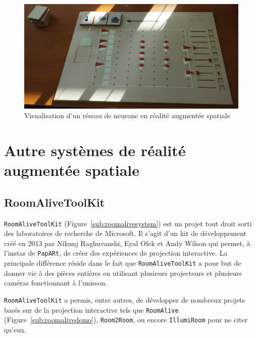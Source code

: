 \begin{figure}[H]
\centering
\includegraphics[width=0.65\linewidth]{images/neural-network}
\caption{Visualisation d'un réseau de neurone en réalité augmentée spatiale\protect\footnotemark}
\label{fig:neuralnetwork}
\end{figure}


\section{Autre systèmes de réalité augmentée spatiale}
\label{sec:SARother}

\subsection{RoomAliveToolKit} 
\texttt{RoomAliveToolKit}\cite{Jones:2014:RME:2642918.2647383} (Figure~\ref{sub:roomalivesystem}) est un projet tout droit sorti des laboratoires de recherche de Microsoft. Il s'agit d'un kit de développement créé en 2013 par Nikunj Raghuvanshi, Eyal Ofek et Andy Wilson qui permet, à l'instar de \texttt{\texttt{PapARt}}, de créer des expériences de projection interactive. La principale différence réside dans le fait que \texttt{RoomAliveToolKit} a pour but de donner vie à des pièces entières en utilisant plusieurs projecteurs et plusieurs caméras fonctionnant à l'unisson.

\texttt{RoomAliveToolKit} a permis, entre autres, de développer de nombreux projets basés sur de la projection interactive tels que \texttt{RoomAlive} (Figure~\ref{sub:roomalivedemo}), \texttt{Room2Room}, ou encore \texttt{IllumiRoom} pour ne citer qu'eux.


